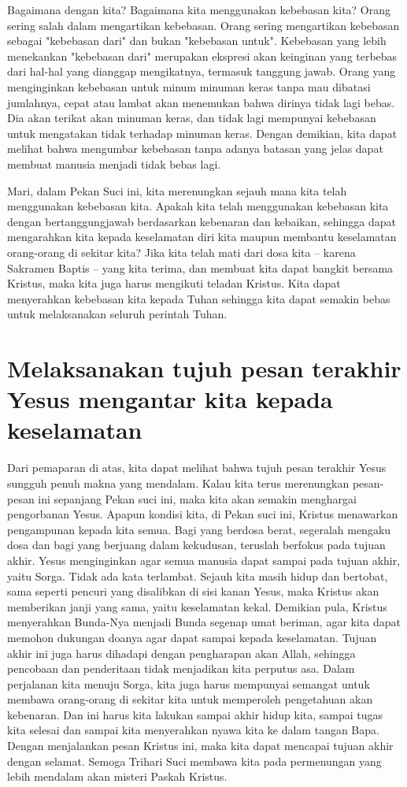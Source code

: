 Bagaimana dengan kita? Bagaimana kita menggunakan kebebasan kita? Orang sering
salah dalam mengartikan kebebasan. Orang sering mengartikan kebebasan sebagai
"kebebasan dari" dan bukan "kebebasan untuk".
Kebebasan yang lebih menekankan "kebebasan dari" merupakan ekspresi akan
keinginan yang terbebas dari hal-hal yang dianggap mengikatnya, termasuk
tanggung jawab. Orang yang menginginkan kebebasan untuk minum minuman keras
tanpa mau dibatasi jumlahnya, cepat atau lambat akan menemukan bahwa dirinya
tidak lagi bebas. Dia akan terikat akan minuman keras, dan tidak lagi mempunyai
kebebasan untuk mengatakan tidak terhadap minuman keras. Dengan demikian, kita
dapat melihat bahwa mengumbar kebebasan tanpa adanya batasan yang jelas dapat
membuat manusia menjadi tidak bebas lagi. 

Mari, dalam Pekan Suci ini, kita merenungkan sejauh mana kita telah menggunakan
kebebasan kita. Apakah kita telah menggunakan kebebasan kita dengan
bertanggungjawab berdasarkan kebenaran dan kebaikan, sehingga dapat mengarahkan
kita kepada keselamatan diri kita maupun membantu keselamatan orang-orang di
sekitar kita? Jika kita telah mati dari dosa kita -- karena Sakramen Baptis --
yang kita terima, dan membuat kita dapat bangkit bersama Kristus, maka kita
juga harus mengikuti teladan Kristus. Kita dapat menyerahkan kebebasan kita
kepada Tuhan sehingga kita dapat semakin bebas untuk melaksanakan seluruh
perintah Tuhan.

\section{Melaksanakan tujuh pesan terakhir Yesus mengantar kita kepada keselamatan}

Dari pemaparan di atas, kita dapat melihat bahwa tujuh pesan terakhir Yesus
sungguh penuh makna yang mendalam. Kalau kita terus merenungkan pesan-pesan ini
sepanjang Pekan suci ini, maka kita akan semakin menghargai pengorbanan Yesus.
Apapun kondisi kita, di Pekan suci ini, Kristus menawarkan pengampunan kepada
kita semua. Bagi yang berdosa berat, segeralah mengaku dosa dan bagi yang
berjuang dalam kekudusan, teruslah berfokus pada tujuan akhir. Yesus
menginginkan agar semua manusia dapat sampai pada tujuan akhir, yaitu Sorga.
Tidak ada kata terlambat. Sejauh kita masih hidup dan bertobat, sama seperti
pencuri yang disalibkan di sisi kanan Yesus, maka Kristus akan memberikan janji
yang sama, yaitu keselamatan kekal.
Demikian pula, Kristus menyerahkan Bunda-Nya menjadi Bunda segenap umat
beriman, agar kita dapat memohon dukungan doanya agar dapat sampai kepada
keselamatan. Tujuan akhir ini juga harus dihadapi dengan pengharapan akan
Allah, sehingga pencobaan dan penderitaan tidak menjadikan kita perputus asa.
Dalam perjalanan kita menuju Sorga, kita juga harus mempunyai semangat untuk
membawa orang-orang di sekitar kita untuk memperoleh pengetahuan akan
kebenaran. Dan ini harus kita lakukan sampai akhir hidup kita, sampai tugas
kita selesai dan sampai kita menyerahkan nyawa kita ke dalam tangan Bapa.
Dengan menjalankan pesan Kristus ini, maka kita dapat mencapai tujuan akhir
dengan selamat.
Semoga Trihari Suci membawa kita pada permenungan yang lebih mendalam akan
misteri Paskah Kristus.

